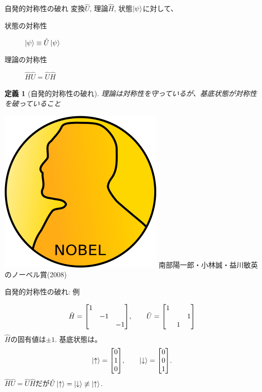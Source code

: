 \documentclass[dvipdfm]{beamer}
\newtheorem*{defn}{定義}
\begin{document}
\begin{frame}{自発的対称性の破れ}
    変換$\hat{U}$, 理論$\hat{H}$, 状態$\ket{\mathrm{\psi}}$に対して、
    \begin{description}
        \item[状態の対称性] $\ket{\psi}\equiv\hat{U}\ket{\psi}$
        \item[理論の対称性] $\hat{H}\hat{U}=\hat{U}\hat{H}$
    \end{description}
    \begin{defn}[自発的対称性の破れ]
        理論は対称性を守っているが、基底状態が対称性を破っていること
    \end{defn}
    \includegraphics[width=0.1\linewidth]{Nobel_prize_medal.svg.png}
    南部陽一郎・小林誠・益川敏英のノーベル賞(2008)
\end{frame}

\begin{frame}{自発的対称性の破れ: 例}
    \begin{example}
        \begin{equation*}
            \hat{H}
            =
            \mqty[\dmat{1,-1,-1}],
            \qquad
            \hat{U}
            =
            \mqty[1 & & \\ & & 1 \\ & 1 &]
        \end{equation*}
        $\hat{H}$の固有値は$\pm1$.
        基底状態は。
        \begin{equation*}
            \ket{\uparrow}
            =
            \mqty[0 \\ 1 \\ 0],
            \qquad
            \ket{\downarrow}
            =
            \mqty[0 \\ 0 \\ 1].
        \end{equation*}
        $\hat{H}\hat{U}=\hat{U}\hat{H}$だが$\hat{U}\ket{\uparrow}=\ket{\downarrow}\not\equiv\ket{\uparrow}$.
        \textbf{}
    \end{example}
\end{frame}
\end{document}
